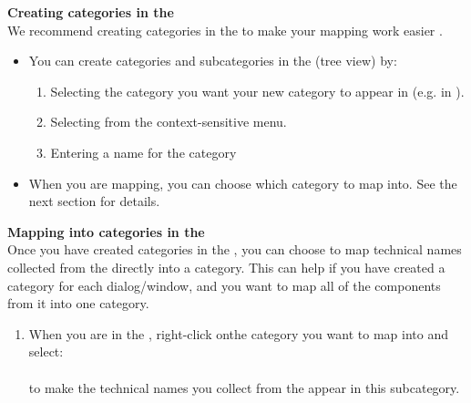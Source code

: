\textbf{Creating categories in the \gdomeditor{}}\\
\label{omcats}
We recommend creating categories in the \gdomeditor{} to make your mapping work easier . 
\begin{itemize}
\item You can create categories and subcategories in the \gdomeditor{} (tree view) by:
\begin{enumerate}
\item Selecting the category you want your new category to appear in (e.g. in ).
\item Selecting  from the context-sensitive menu. 
\item Entering a name for the category
\end{enumerate}
\item When you are mapping, you can choose which category to map into. See the next section  for details.
\end{itemize}


\textbf{Mapping into categories in the \gdomeditor{}}\\
\label{mapcat}
Once you have created categories in the \gdomeditor{}, you can choose to map technical names collected from the \gdaut{} directly into a category. This can help if you have created a category for each dialog/window, and you want to map all of the components from it into one category.  

\begin{enumerate}
\item When you are in the \gdomm{}, right-click onthe category you want to map into and select:\\
\\ 
to make the technical names you collect from the \gdaut{} appear in this subcategory. 
\end{enumerate}
